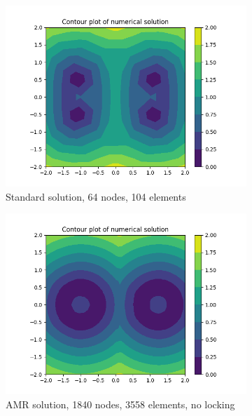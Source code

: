 \documentclass[11pt]{article}
\begin{document}
\begin{figure}
  \centering
  \begin{subfigure}[b]{0.45\textwidth}
    \includegraphics[scale=0.6]{solution.png}
    \caption{Standard solution, 64 nodes, 104 elements}
  \end{subfigure}
  \begin{subfigure}[b]{0.45\textwidth}
    \includegraphics[scale=0.6]{AMRsolution.png}
    \caption{AMR solution, 1840 nodes, 3558 elements, no locking}
  \end{subfigure}
  \begin{subfigure}[b]{0.45\textwidth}

\end{subfigure}
\end{figure}
\end{document}
